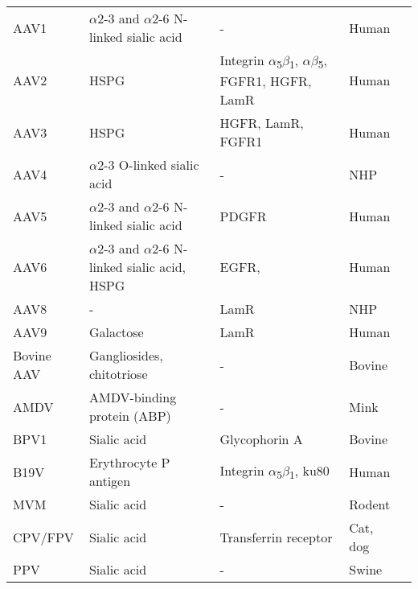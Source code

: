 \begin{small}
\begin{center}
\begin{longtable}{P{0.7in} P{1.65in} P{1.45in} P{0.6in} P{0.8in}}
AAV1 & $\alpha$2-3 and $\alpha$2-6 N-linked sialic acid & - & Human & \cite{pmid16940521} \\
AAV2 & HSPG & Integrin $\alpha$\textsubscript{5}$\beta$\textsubscript{1}, $\alpha$\textsubscript{}$\beta$\textsubscript{5}, FGFR1, HGFR, LamR & Human & \cite{pmid16973587, pmid15596854, pmid9883842, pmid9883843, pmid9445046, pmid16940508} \\
AAV3 & HSPG & HGFR, LamR, FGFR1 & Human & \cite{pmid16973587, pmid20545554, pmid16195782} \\
AAV4 & $\alpha$2-3 O-linked sialic acid & - & NHP & \cite{pmid11435568} \\
AAV5 & $\alpha$2-3 and $\alpha$2-6 N-linked sialic acid & PDGFR & Human & \cite{pmid14502277, pmid16409121, pmid11262413, pmid11435568} \\   
AAV6 & $\alpha$2-3 and $\alpha$2-6 N-linked sialic acid, HSPG & EGFR, & Human & \cite{pmid20473307, pmid16940521, pmid16943302} \\  
AAV8 & - & LamR & NHP & \cite{pmid16973587} \\
AAV9 & Galactose & LamR & Human & \cite{pmid16973587, pmid21576824, pmid21330365} \\
Bovine AAV & Gangliosides, chitotriose & - & Bovine & \cite{pmid20231878, pmid16699032} \\
AMDV & AMDV-binding protein (ABP) & - & Mink & \cite{pmid10196278} \\
BPV1 & Sialic acid & Glycophorin A & Bovine & \cite{pmid15750863, pmid9747725} \\
B19V & Erythrocyte P antigen & Integrin $\alpha$\textsubscript{5}$\beta$\textsubscript{1}, ku80 & Human & \cite{pmid8211117, pmid15661151, pmid12907437, pmid16076874, weigel} \\
MVM & Sialic acid & - & Rodent & \cite{pmid3296697, pmid15229399, pmid16822863} \\
CPV/FPV & Sialic acid & Transferrin receptor & Cat, dog & \cite{pmid11264378, pmid12525605} \\
PPV & Sialic acid & - & Swine & \cite{pmid20484503} \\

     
\end{longtable}
\end{center} 
\end{small}


